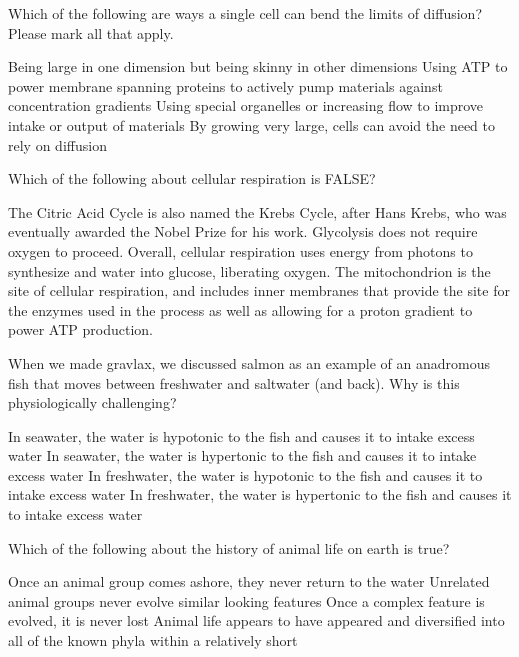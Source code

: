 \documentclass[exam,addpoints,noanswers]{exam}
\begin{document}
\begin{questions}
\question[1] Which of the following are ways a single cell can bend the limits of diffusion? Please mark all that apply. 
\begin{choices}
\CorrectChoice Being large in one dimension but being skinny in other dimensions
\CorrectChoice Using ATP to power membrane spanning proteins to actively pump materials against concentration gradients
\CorrectChoice Using special organelles or increasing flow to improve intake or output of materials
\choice By growing very large, cells can avoid the need to rely on diffusion
\end{choices}




\question[1] Which of the following about cellular respiration is FALSE? 
\begin{choices}
\choice The Citric Acid Cycle is also named the Krebs Cycle, after Hans Krebs, who was eventually awarded the Nobel Prize for his work. 
\choice Glycolysis does not require oxygen to proceed. 
\CorrectChoice Overall, cellular respiration uses energy from photons to synthesize  and water into glucose, liberating oxygen. 
\choice The mitochondrion is the site of cellular respiration, and includes inner membranes that provide the site for the enzymes used in the process as well as allowing for a proton gradient to power ATP production. 
\end{choices}




\question[1] When we made gravlax, we discussed salmon as an example of an anadromous fish that moves between freshwater and saltwater (and back). Why is this physiologically challenging? 
\begin{choices}
\choice In seawater, the water is hypotonic to the fish and causes it to intake excess water
\choice In seawater, the water is hypertonic to the fish and causes it to intake excess water
\CorrectChoice In freshwater, the water is hypotonic to the fish and causes it to intake excess water
\choice In freshwater, the water is hypertonic to the fish and causes it to intake excess water
\end{choices}




\question[1] Which of the following about the history of animal life on earth is true? 
\begin{choices}
\choice Once an animal group comes ashore, they never return to the water
\choice Unrelated animal groups never evolve similar looking features
\choice Once a complex feature is evolved, it is never lost
\CorrectChoice Animal life appears to have appeared and diversified into all of the known phyla within a relatively short 
\end{choices}



\end{questions}
\end{document}
